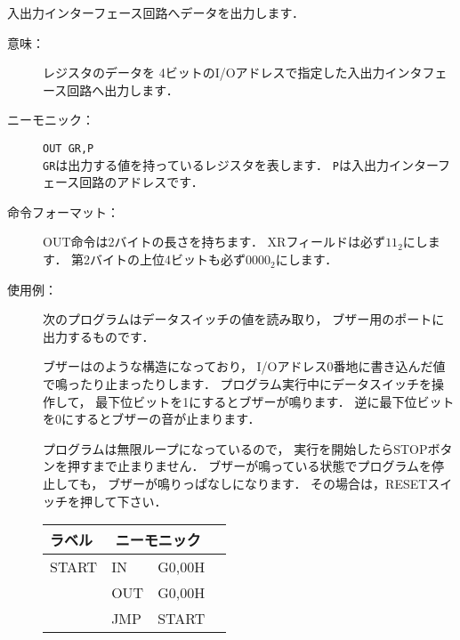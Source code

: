 入出力インターフェース回路へデータを出力します．

\begin{description}
\item[意味：]レジスタのデータを
  4ビットのI/Oアドレスで指定した入出力インタフェース回路へ出力します．

\item[ニーモニック：]\texttt{OUT  GR,P} \\
  \texttt{GR}は出力する値を持っているレジスタを表します．
  \texttt{P}は入出力インターフェース回路のアドレスです．

\item[命令フォーマット：]OUT命令は2バイトの長さを持ちます．
  XRフィールドは必ず$11_2$にします．
  第2バイトの上位4ビットも必ず$0000_2$にします．


\item[使用例：]
  次のプログラムはデータスイッチの値を読み取り，
  ブザー用のポートに出力するものです．

  ブザーはのような構造になっており，
  I/Oアドレス0番地に書き込んだ値で鳴ったり止まったりします．
  プログラム実行中にデータスイッチを操作して，
  最下位ビットを1にするとブザーが鳴ります．
  逆に最下位ビットを0にするとブザーの音が止まります．

  プログラムは無限ループになっているので，
  実行を開始したらSTOPボタンを押すまで止まりません．
  ブザーが鳴っている状態でプログラムを停止しても，
  ブザーが鳴りっぱなしになります．
  その場合は，RESETスイッチを押して下さい．

  {\ttfamily\small\begin{center}
    \begin{tabular}{|l|l l|l}
      \cline{1-3}
      ラベル & \multicolumn{2}{|c|}{ニーモニック} \\
      \hline
      START & IN   & G0,00H  \\
      & OUT  & G0,00H  \\
      & JMP  & START   \\ 
      \hline
    \end{tabular}
  \end{center}}


\end{description}

